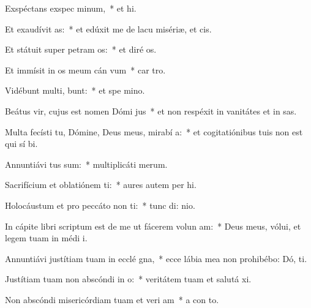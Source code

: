 \item Exspéctans exspec minum,~* et  hi.
\item Et exaudívit  as:~* et edúxit me de lacu misériæ, et   cis.
\item Et státuit super petram  os:~* et diré  os.
\item Et immísit in os meum cán vum~* car  tro.
\item Vidébunt multi,  bunt:~* et spe  mino.
\item Beátus vir, cujus est nomen Dómi  jus~* et non respéxit in vanitátes et in sas.
\item Multa fecísti tu, Dómine, Deus meus, mirabí a:~* et cogitatiónibus tuis non est qui sí  bi.
\item Annuntiávi  tus sum:~* multiplicáti   merum.
\item Sacrifícium et oblatiónem ti:~* aures autem per hi.
\item Holocáustum et pro peccáto non ti:~* tunc di:  nio.
\item In cápite libri scriptum est de me ut fácerem volun am:~* Deus meus, vólui, et legem tuam in médi  i.
\item Annuntiávi justítiam tuam in ecclé gna,~* ecce lábia mea non prohibébo: Dó,  ti.
\item Justítiam tuam non abscóndi in  o:~* veritátem tuam et salutá  xi.
\item Non abscóndi misericórdiam tuam et veri am~* a con to.
